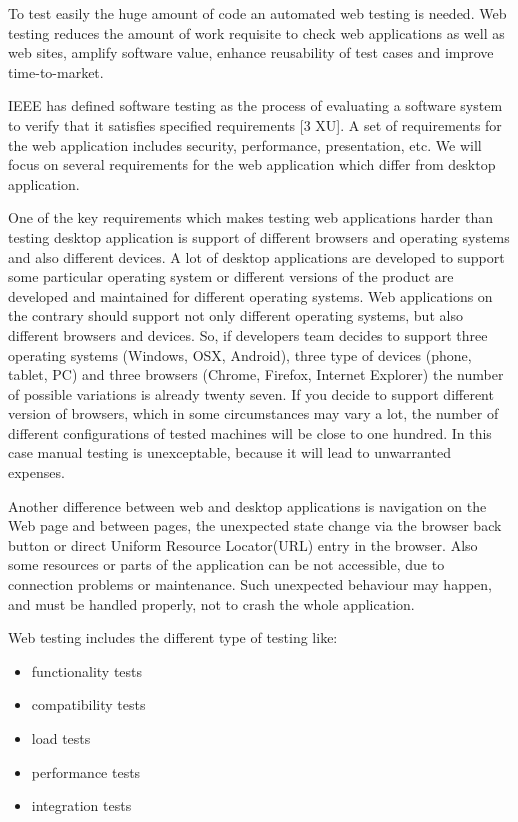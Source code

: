 	 	 To test easily the huge amount of code an automated web testing is needed.	
	 	 Web testing reduces the amount of work requisite to check web applications as well as web sites, amplify software value, enhance
	 	 reusability of test cases and improve time-to-market.
	   
		IEEE has defined software testing as the process of evaluating a software
		system to verify that it satisfies specified requirements [3 XU]. A set of
		requirements for the web application includes security, performance,
		presentation, etc. We will focus on several requirements for the web
		application which differ from desktop application. 
		
		One of the key requirements which makes testing web applications harder than
		testing desktop application is support of different browsers and operating systems and also
		different devices. A lot of desktop applications are developed to support some
		particular operating system or different versions of the product are developed
		and maintained for different operating systems. Web applications on the
		contrary should support not only different operating systems, but also
		different browsers and devices. So, if developers team decides to support
		three operating systems (Windows, OSX, Android), three type of devices (phone,
		tablet, PC) and three browsers (Chrome, Firefox, Internet Explorer) the number
		of possible variations is already twenty seven. If you decide to support
		different version of browsers, which in some circumstances may vary a lot,
		the number of different configurations of tested machines will be close to
		one hundred. In this case manual testing is unexceptable, because it will lead
		to unwarranted expenses. 
		
		Another difference between web and desktop applications is
		navigation on the Web page and between pages, the unexpected state change via
		the browser back button or direct Uniform Resource Locator(URL) entry in the
		browser. Also some resources or parts of the application can be not
		accessible, due to connection problems or maintenance. Such unexpected
		behaviour may happen, and must be handled properly, not to crash the whole application.

		Web testing includes the different type of testing like:
		\begin{itemize}
		  \item functionality tests
		  \item compatibility tests
		  \item load tests
		  \item performance tests
		  \item integration tests
		\end{itemize}

